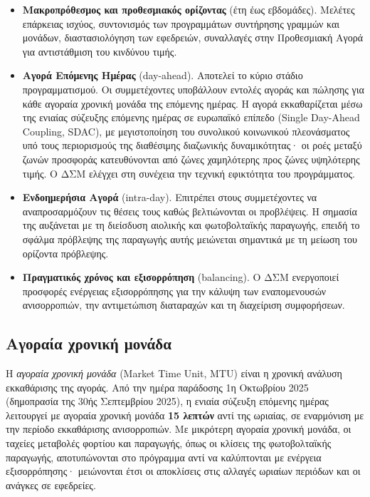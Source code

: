 \begin{itemize}
\item \textbf{Μακροπρόθεσμος και προθεσμιακός ορίζοντας} (έτη έως εβδομάδες). Μελέτες
      επάρκειας ισχύος, συντονισμός των προγραμμάτων συντήρησης γραμμών και μονάδων,
      διαστασιολόγηση των εφεδρειών, συναλλαγές στην Προθεσμιακή Αγορά για αντιστάθμιση
      του κινδύνου τιμής.
\item \textbf{Αγορά Επόμενης Ημέρας} (day-ahead). Αποτελεί το κύριο στάδιο
      προγραμματισμού. Οι συμμετέχοντες υποβάλλουν εντολές αγοράς και πώλησης για κάθε
      αγοραία χρονική μονάδα της επόμενης ημέρας. Η αγορά εκκαθαρίζεται μέσω της ενιαίας
      σύζευξης επόμενης ημέρας σε ευρωπαϊκό επίπεδο (Single Day-Ahead Coupling, SDAC), με
      μεγιστοποίηση του συνολικού κοινωνικού πλεονάσματος υπό τους περιορισμούς της
      διαθέσιμης διαζωνικής δυναμικότητας· οι ροές μεταξύ ζωνών προσφοράς κατευθύνονται
      από ζώνες χαμηλότερης προς ζώνες υψηλότερης τιμής. Ο ΔΣΜ ελέγχει στη συνέχεια την
      τεχνική εφικτότητα του προγράμματος.
\item \textbf{Ενδοημερήσια Αγορά} (intra-day). Επιτρέπει στους συμμετέχοντες να
      αναπροσαρμόζουν τις θέσεις τους καθώς βελτιώνονται οι προβλέψεις. Η σημασία της
      αυξάνεται με τη διείσδυση αιολικής και φωτοβολταϊκής παραγωγής, επειδή το σφάλμα
      πρόβλεψης της παραγωγής αυτής μειώνεται σημαντικά με τη μείωση του ορίζοντα
      πρόβλεψης.
\item \textbf{Πραγματικός χρόνος και εξισορρόπηση} (balancing). Ο ΔΣΜ ενεργοποιεί προσφορές
      ενέργειας εξισορρόπησης για την κάλυψη των εναπομενουσών ανισορροπιών, την
      αντιμετώπιση διαταραχών και τη διαχείριση συμφορήσεων.
\end{itemize}

\subsection{Αγοραία χρονική μονάδα}

Η \emph{αγοραία χρονική μονάδα} (Market Time Unit, MTU) είναι η χρονική ανάλυση εκκαθάρισης
της αγοράς. Από την ημέρα παράδοσης 1η Οκτωβρίου 2025 (δημοπρασία της 30ής Σεπτεμβρίου
2025), η ενιαία σύζευξη επόμενης ημέρας λειτουργεί με αγοραία χρονική μονάδα \textbf{15
λεπτών} αντί της ωριαίας, σε εναρμόνιση με την περίοδο εκκαθάρισης ανισορροπιών. Με
μικρότερη αγοραία χρονική μονάδα, οι ταχείες μεταβολές φορτίου και παραγωγής, όπως οι
κλίσεις της φωτοβολταϊκής παραγωγής, αποτυπώνονται στο πρόγραμμα αντί να καλύπτονται με
ενέργεια εξισορρόπησης· μειώνονται έτσι οι αποκλίσεις στις αλλαγές ωριαίων περιόδων και οι
ανάγκες σε εφεδρείες.

